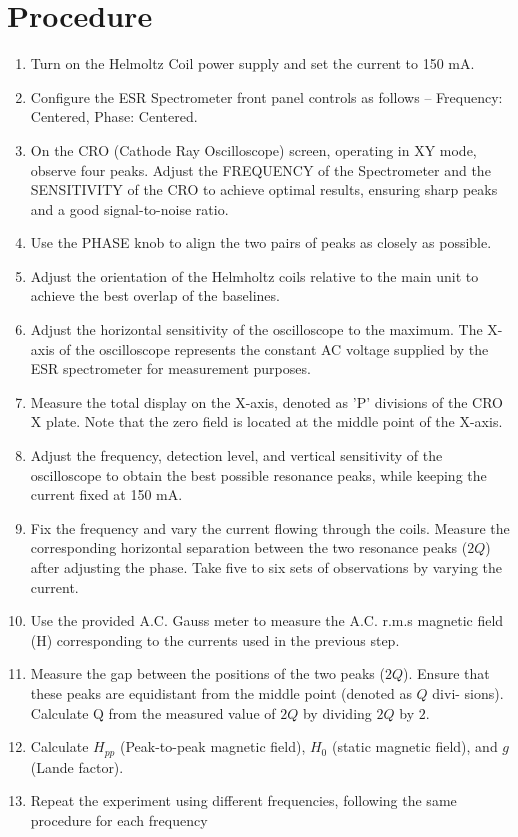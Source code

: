 \section{Procedure}

\begin{enumerate}
    \item Turn on the Helmoltz Coil power supply and set
    the current to 150 mA.
    \item Configure the ESR Spectrometer front panel
    controls as follows -- Frequency: Centered, Phase: Centered.
    \item On the CRO (Cathode Ray Oscilloscope) screen, operating in XY mode, observe four peaks. Adjust the FREQUENCY of the Spectrometer and the SENSITIVITY of the CRO to achieve optimal results, ensuring sharp peaks and a good signal-to-noise ratio.
    \item Use the PHASE knob to align the two pairs of
    peaks as closely as possible.
    \item Adjust the orientation of the Helmholtz coils
    relative to the main unit to achieve the best
    overlap of the baselines.
    \item Adjust the horizontal sensitivity of the oscilloscope to the
    maximum. The X-axis of the oscilloscope represents the constant AC voltage supplied by the
    ESR spectrometer for measurement purposes.
    \item Measure the total
    display on the X-axis, denoted as 'P' divisions
    of the CRO X plate. Note that the zero field is
    located at the middle point of the X-axis.
    \item Adjust the frequency, detection level, and vertical sensitivity
    of the oscilloscope to obtain the best possible
    resonance peaks, while keeping the current fixed
    at 150 mA.
    \item Fix the frequency and vary the current
    flowing through the coils. Measure the corresponding horizontal separation between the two
    resonance peaks ($2Q$) after adjusting the phase.
    Take five to six sets of observations by varying
    the current.
    \item Use the provided A.C. Gauss meter to measure the A.C.
    r.m.s magnetic field (H) corresponding to the
    currents used in the previous step.
    \item Measure
    the gap between the positions of the two peaks
    ($2Q$). Ensure that these peaks are equidistant
    from the middle point (denoted as $Q$ divi-
    sions). Calculate Q from the measured
    value of $2Q$ by dividing $2Q$ by $2$.
    \item Calculate $H_{pp}$ (Peak-to-peak
    magnetic field), $H_0$ (static magnetic field), and $g$ (Lande factor).
    \item Repeat the experiment using different frequencies,
    following the same procedure for each frequency

\end{enumerate}